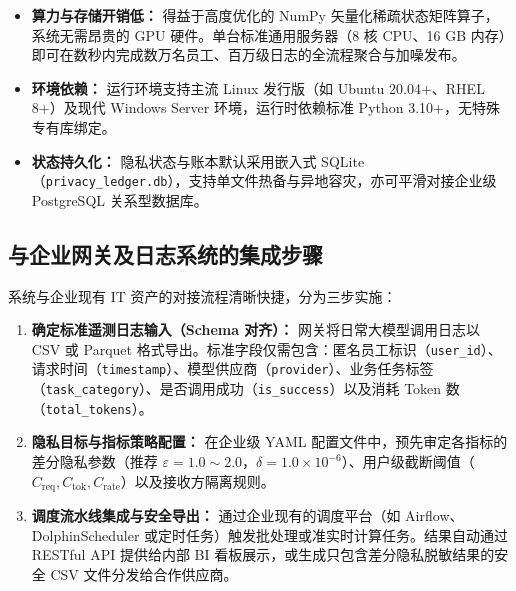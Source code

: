 \begin{itemize}[leftmargin=2em]
  \item \textbf{算力与存储开销低：} 得益于高度优化的 NumPy 矢量化稀疏状态矩阵算子，系统无需昂贵的 GPU 硬件。单台标准通用服务器（8 核 CPU、16 GB 内存）即可在数秒内完成数万名员工、百万级日志的全流程聚合与加噪发布。
  \item \textbf{环境依赖：} 运行环境支持主流 Linux 发行版（如 Ubuntu 20.04+、RHEL 8+）及现代 Windows Server 环境，运行时依赖标准 Python 3.10+，无特殊专有库绑定。
  \item \textbf{状态持久化：} 隐私状态与账本默认采用嵌入式 SQLite（\texttt{privacy\_ledger.db}），支持单文件热备与异地容灾，亦可平滑对接企业级 \mbox{PostgreSQL} 关系型数据库。
\end{itemize}

\subsection{与企业网关及日志系统的集成步骤}
系统与企业现有 IT 资产的对接流程清晰快捷，分为三步实施：
\begin{enumerate}[label=\textbf{第 \arabic* 步：}, leftmargin=4em]
  \item \textbf{确定标准遥测日志输入（Schema 对齐）：} 网关将日常大模型调用日志以 CSV 或 Parquet 格式导出。标准字段仅需包含：匿名员工标识（\texttt{user\_id}）、请求时间（\texttt{timestamp}）、模型供应商（\texttt{provider}）、业务任务标签（\texttt{task\_category}）、是否调用成功（\texttt{is\_success}）以及消耗 Token 数（\texttt{total\_tokens}）。
  \item \textbf{隐私目标与指标策略配置：} 在企业级 YAML 配置文件中，预先审定各指标的差分隐私参数（推荐 $\varepsilon = 1.0 \sim 2.0$，$\delta = 1.0 \times 10^{-6}$）、用户级截断阈值（$C_{\text{req}}, C_{\text{tok}}, C_{\text{rate}}$）以及接收方隔离规则。
  \item \textbf{调度流水线集成与安全导出：} 通过企业现有的调度平台（如 Airflow、DolphinScheduler 或定时任务）触发批处理或准实时计算任务。结果自动通过 RESTful API 提供给内部 BI 看板展示，或生成只包含差分隐私脱敏结果的安全 CSV 文件分发给合作供应商。
\end{enumerate}
